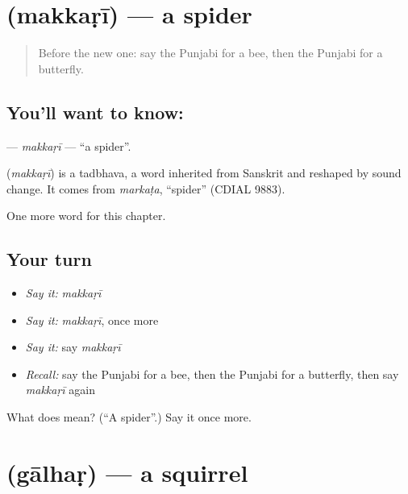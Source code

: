 \section[\texorpdfstring{\pa{ਮੱਕੜੀ} (makkaṛī)}{ਮੱਕੜੀ (makkaṛī)}]{ (makkaṛī) — a spider}

\label{lesson:PA-C132-makkari}



\begin{quote}
Before the new one: say the Punjabi for a bee, then the Punjabi for a butterfly.
\end{quote}

\subsection*{You'll want to know: }
\textbf{} — \emph{makkaṛī} — \textquotedblleft{}a spider\textquotedblright{}.

\begin{cousinweb}
\textbf{} (\emph{makkaṛī}) is a tadbhava, a word inherited from Sanskrit and reshaped by sound change. It comes from \emph{markaṭa}, \textquotedblleft{}spider\textquotedblright{} (CDIAL 9883).
\end{cousinweb}

\begin{grammarlens}[title={What you've built}]
One more word for this chapter.
\end{grammarlens}

\subsection*{Your turn}
\begin{itemize}
\raggedright
  \item \emph{Say it:} \emph{makkaṛī}
  \item \emph{Say it:} \emph{makkaṛī}, once more
  \item \emph{Say it:} say \emph{makkaṛī}
  \item \emph{Recall:} say the Punjabi for a bee, then the Punjabi for a butterfly, then say \emph{makkaṛī} again
\end{itemize}

\begin{tcolorbox}[breakable,colback=teal!4,colframe=teal!35!black,title={Before you move on}]
What does  mean? (\textquotedblleft{}A spider\textquotedblright{}.) Say it once more.
\end{tcolorbox}
\section[\texorpdfstring{\pa{ਗਾਲ੍ਹੜ} (gālhaṛ)}{ਗਾਲ੍ਹੜ (gālhaṛ)}]{ (gālhaṛ) — a squirrel}

